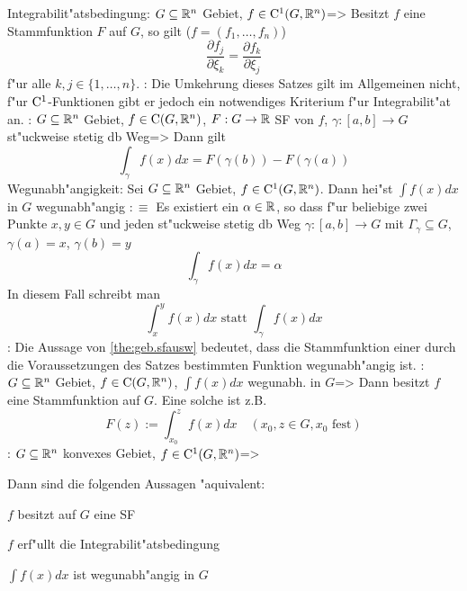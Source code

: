 \theorem Integrabilit"atsbedingung:
  $G\subseteq\mathbb R^n$ Gebiet, $f\in{\rm C}^1(G,\mathbb R^n)$=>{
  Besitzt $f$ eine Stammfunktion $F$ auf $G$, so gilt ($f=(f_1,\ldots,f_n)$)
  \[\frac{\partial f_j}{\partial \xi_k}=\frac{\partial f_k}{\partial \xi_j}
    \]
  f"ur alle $k,j\in\{1,\ldots,n\}$.
  }
\remark:{
  Die Umkehrung dieses Satzes gilt im Allgemeinen nicht, f"ur 
  ${\rm C}^1$-Funktionen gibt er jedoch ein notwendiges Kriterium f"ur
  Integrabilit"at an.
  }
\theorem:
  $G\subseteq\mathbb R^n$ Gebiet, $f\in{\rm C}(G,\mathbb R^n)$, 
  $F:G\to\mathbb R$ SF von $f$, $\gamma:[a,b]\to G$ st"uckweise stetig db Weg=>{
  \label{the:geb.sfausw}
  Dann gilt
  \[\int_\gamma f(x) dx = F(\gamma(b))-F(\gamma(a))
    \]
  }
 Wegunabh"angigkeit:{
  Sei $G\subseteq\mathbb R^n$ Gebiet, $f\in{\rm C}^1(G,\mathbb R^n)$.
  Dann hei"st $\int f(x)dx$ in $G$ wegunabh"angig $:\equiv$
  Es existiert ein $\alpha\in\mathbb R$, so dass f"ur beliebige zwei Punkte 
  $x,y\in G$ und jeden st"uckweise stetig db Weg $\gamma:[a,b]\to G$ mit 
  $\Gamma_\gamma\subseteq G$, $\gamma(a)=x$, $\gamma(b)=y$ 
  \[\int_\gamma f(x)dx=\alpha
    \]
  In diesem Fall schreibt man
  \[\int_x^y f(x) dx\text{ statt }\int_\gamma f(x)dx
    \]
  }
\remark:{
  Die Aussage von \ref{the:geb.sfausw} bedeutet, dass die Stammfunktion einer
  durch die Voraussetzungen des Satzes bestimmten Funktion wegunabh"angig ist.
  }
\theorem:
  $G\subseteq\mathbb R^n$ Gebiet, $f\in{\rm C}(G,\mathbb R^n)$, 
  $\int f(x)dx$ wegunabh. in $G$=>
  {
  Dann besitzt $f$ eine Stammfunktion auf $G$. Eine solche ist z.B.
  \[F(z):=\int_{x_0}^z f(x) dx\quad (x_0,z\in G, x_0 \text{ fest})
    \]
  }
\theorem:
  $G\subseteq\mathbb R^n$ konvexes Gebiet, $f\in{\rm C}^1(G,\mathbb R^n)$=>{
  Dann sind die folgenden Aussagen "aquivalent:
  \begin{stmts}
    \item $f$ besitzt auf $G$ eine SF
    \item $f$ erf"ullt die Integrabilit"atsbedingung
    \item $\int f(x)dx$ ist wegunabh"angig in $G$
    \end{stmts}
  }
